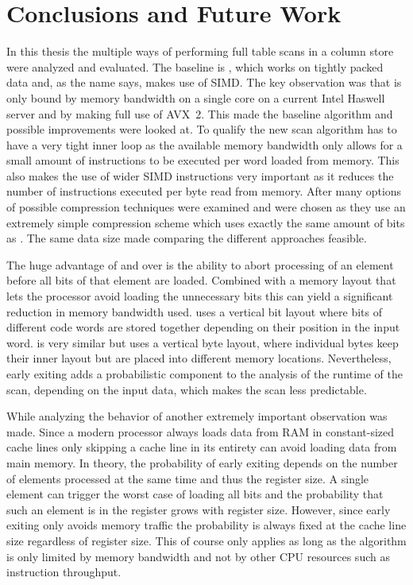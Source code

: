 \chapter{Conclusions and Future Work}

In this thesis the multiple ways of performing full table scans in a column
store were analyzed and evaluated. The baseline is \simdscan{}, which works on
tightly packed data and, as the name says, makes use of SIMD. The key
observation was that \simdscan{} is only bound by memory bandwidth on a single
core on a current Intel Haswell server and by making full use of AVX~2. This
made \simdscan{} the baseline algorithm and possible improvements were looked
at. To qualify the new scan algorithm has to have a very tight inner loop as
the available memory bandwidth only allows for a small amount of instructions
to be executed per word loaded from memory. This also makes the use of wider
SIMD instructions very important as it reduces the number of instructions
executed per byte read from memory. After many options of possible compression
techniques were examined \bwv{} and \bs{} were chosen as they use an extremely
simple compression scheme which uses exactly the same amount of bits as
\simdscan{}. The same data size made comparing the different approaches
feasible.

The huge advantage of \bwv{} and \bs{} over \simdscan{} is the ability to abort
processing of an element before all bits of that element are loaded. Combined
with a memory layout that lets the processor avoid loading the unnecessary bits
this can yield a significant reduction in memory bandwidth used. \bwv{} uses a
vertical bit layout where bits of different code words are stored together
depending on their position in the input word. \bs{} is very similar but uses a
vertical byte layout, where individual bytes keep their inner layout but are
placed into different memory locations. Nevertheless, early exiting adds a
probabilistic component to the analysis of the runtime of the scan, depending on
the input data, which makes the scan less predictable.

While analyzing the behavior of \bwv{} another extremely important observation
was made. Since a modern processor always loads data from RAM in constant-sized
cache lines only skipping a cache line in its entirety can avoid loading data
from main memory. In theory, the probability of early exiting depends on the
number of elements processed at the same time and thus the register size. A
single element can trigger the worst case of loading all bits and the
probability that such an element is in the register grows with register size.
However, since early exiting only avoids memory traffic the probability is
always fixed at the cache line size regardless of register size. This of course
only applies as long as the algorithm is only limited by memory bandwidth and
not by other CPU resources such as instruction throughput.


